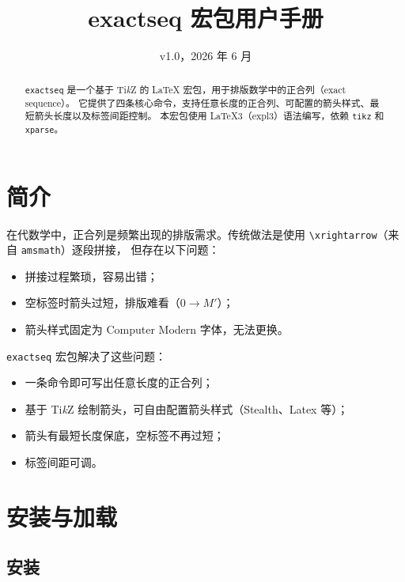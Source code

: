 \documentclass[fontset=fandol]{ctexart}
\title{\bfseries exactseq 宏包用户手册}
\author{}
\date{v1.0，2026 年 6 月}
\newcommand{\pkg}[1]{\texttt{#1}}
\newcommand{\cmd}[1]{\texttt{\textbackslash #1}}
\begin{document}
\maketitle
\tableofcontents
\vspace{2em}

\begin{abstract}
\pkg{exactseq} 是一个基于 Ti\textit{k}Z 的 \LaTeX{} 宏包，用于排版数学中的正合列（exact sequence）。
它提供了四条核心命令，支持任意长度的正合列、可配置的箭头样式、最短箭头长度以及标签间距控制。
本宏包使用 \LaTeX3（expl3）语法编写，依赖 \pkg{tikz} 和 \pkg{xparse}。
\end{abstract}

\section{简介}

在代数学中，正合列是频繁出现的排版需求。传统做法是使用 \cmd{xrightarrow}（来自 \pkg{amsmath}）逐段拼接，
但存在以下问题：

\begin{itemize}
  \item 拼接过程繁琐，容易出错；
  \item 空标签时箭头过短，排版难看（$0 \xrightarrow{} M'$）；
  \item 箭头样式固定为 Computer Modern 字体，无法更换。
\end{itemize}

\pkg{exactseq} 宏包解决了这些问题：

\begin{itemize}
  \item 一条命令即可写出任意长度的正合列；
  \item 基于 Ti\textit{k}Z 绘制箭头，可自由配置箭头样式（Stealth、Latex 等）；
  \item 箭头有最短长度保底，空标签不再过短；
  \item 标签间距可调。
\end{itemize}

\section{安装与加载}

\subsection{安装}
\end{document}

